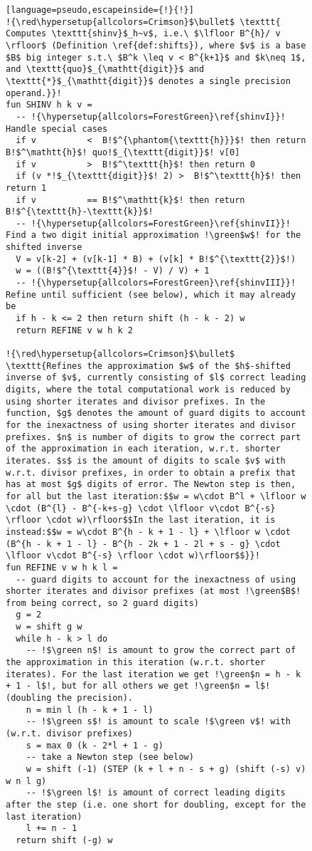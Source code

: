 \begin{figure}
\begin{lstlisting}[language=pseudo,escapeinside={!}{!}]
!{\red\hypersetup{allcolors=Crimson}$\bullet$ \texttt{ Computes \texttt{shinv}$_h~v$, i.e.\ $\lfloor B^{h}/ v \rfloor$ (Definition \ref{def:shifts}), where $v$ is a base $B$ big integer s.t.\ $B^k \leq v < B^{k+1}$ and $k\neq 1$, and \texttt{quo}$_{\mathtt{digit}}$ and \texttt{*}$_{\mathtt{digit}}$ denotes a single precision operand.}}!
fun SHINV h k v =
  -- !{\hypersetup{allcolors=ForestGreen}\ref{shinvI}}! Handle special cases
  if v          <  B!$^{\phantom{\texttt{h}}}$! then return B!$^\mathtt{h}$! quo!$_{\texttt{digit}}$! v[0]
  if v          >  B!$^\texttt{h}$! then return 0
  if (v *!$_{\texttt{digit}}$! 2) >  B!$^\texttt{h}$! then return 1
  if v          == B!$^\mathtt{k}$! then return B!$^{\texttt{h}-\texttt{k}}$!
  -- !{\hypersetup{allcolors=ForestGreen}\ref{shinvII}}! Find a two digit initial approximation !\green$w$! for the shifted inverse
  V = v[k-2] + (v[k-1] * B) + (v[k] * B!$^{\texttt{2}}$!)
  w = ((B!$^{\texttt{4}}$! - V) / V) + 1
  -- !{\hypersetup{allcolors=ForestGreen}\ref{shinvIII}}! Refine until sufficient (see below), which it may already be
  if h - k <= 2 then return shift (h - k - 2) w 
  return REFINE v w h k 2

!{\red\hypersetup{allcolors=Crimson}$\bullet$ \texttt{Refines the approximation $w$ of the $h$-shifted inverse of $v$, currently consisting of $l$ correct leading digits, where the total computational work is reduced by using shorter iterates and divisor prefixes. In the function, $g$ denotes the amount of guard digits to account for the inexactness of using shorter iterates and divisor prefixes. $n$ is number of digits to grow the correct part of the approximation in each iteration, w.r.t. shorter iterates. $s$ is the amount of digits to scale $v$ with w.r.t. divisor prefixes, in order to obtain a prefix that has at most $g$ digits of error. The Newton step is then, for all but the last iteration:$$w = w\cdot B^l + \lfloor w \cdot (B^{l} - B^{-k+s-g} \cdot \lfloor v\cdot B^{-s} \rfloor \cdot w)\rfloor$$In the last iteration, it is instead:$$w = w\cdot B^{h - k + 1 - l} + \lfloor w \cdot (B^{h - k + 1 - l} - B^{h - 2k + 1 - 2l + s - g} \cdot \lfloor v\cdot B^{-s} \rfloor \cdot w)\rfloor$$}}!
fun REFINE v w h k l =
  -- guard digits to account for the inexactness of using shorter iterates and divisor prefixes (at most !\green$B$! from being correct, so 2 guard digits)
  g = 2
  w = shift g w
  while h - k > l do
    -- !$\green n$! is amount to grow the correct part of the approximation in this iteration (w.r.t. shorter iterates). For the last iteration we get !\green$n = h - k + 1 - l$!, but for all others we get !\green$n = l$! (doubling the precision).
    n = min l (h - k + 1 - l)
    -- !$\green s$! is amount to scale !$\green v$! with (w.r.t. divisor prefixes)
    s = max 0 (k - 2*l + 1 - g)
    -- take a Newton step (see below)
    w = shift (-1) (STEP (k + l + n - s + g) (shift (-s) v) w n l g)
    -- !$\green l$! is amount of correct leading digits after the step (i.e. one short for doubling, except for the last iteration)
    l += n - 1
  return shift (-g) w


\end{lstlisting}
\end{figure}
